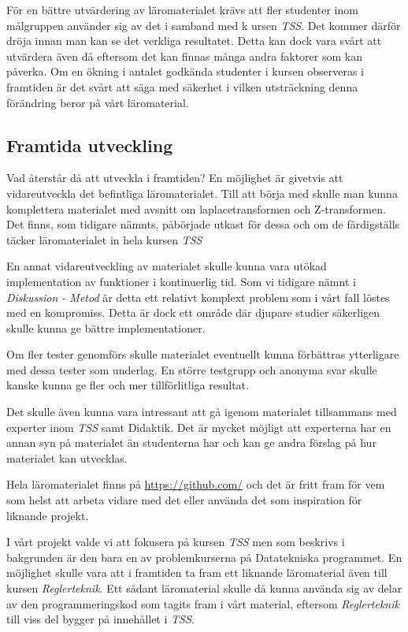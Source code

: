 \documentclass[]{article}
\begin{document}
För en bättre utvärdering av läromaterialet krävs att fler studenter inom målgruppen använder sig av det i samband med k
ursen \textit{TSS}. Det kommer därför dröja innan man kan se det verkliga resultatet. Detta kan dock vara svårt att 
utvärdera även då eftersom det kan finnas många andra faktorer som kan påverka. Om en ökning i antalet godkända 
studenter i kursen observeras i framtiden är det svårt att säga med säkerhet i vilken utsträckning denna förändring 
beror på vårt läromaterial.


\subsection{Framtida utveckling}
Vad återstår då att utveckla i framtiden? En möjlighet är givetvis att vidareutveckla det befintliga 
läromaterialet. Till att börja med skulle man kunna komplettera materialet med avsnitt om laplacetransformen och Z-transformen. Det finns, som tidigare nämnts, påbörjade utkast för dessa och om de färdigställs täcker läromaterialet in hela kursen \textit{TSS}

En annat vidareutveckling av materialet skulle kunna vara utökad implementation av funktioner i kontinuerlig tid. Som vi tidigare nämnt i \textit{Diskussion - Metod} är detta ett relativt komplext problem som i vårt fall löstes med en kompromiss. Detta är dock ett område där djupare studier säkerligen skulle kunna ge bättre implementationer.

Om fler tester genomförs skulle materialet eventuellt kunna förbättras ytterligare med dessa tester som underlag.
En större testgrupp och anonyma svar skulle kanske kunna ge fler och mer tillförlitliga resultat.

Det skulle även kunna vara intressant att gå igenom materialet tillsammans med experter inom \textit{TSS} samt 
Didaktik. Det är mycket möjligt att experterna har en annan syn på materialet än studenterna har och kan ge andra
förslag på hur materialet kan utvecklas.

Hela läromaterialet finns på \url{https://github.com/} och det är fritt fram för vem som helst att arbeta vidare
med det eller använda det som inspiration för liknande projekt.

I vårt projekt valde vi att fokusera på kursen \textit{TSS} men som beskrivs i bakgrunden är den bara en av problemkurserna på Datatekniska programmet. En möjlighet skulle vara att i framtiden ta fram ett liknande läromaterial även till kursen \textit{Reglerteknik}. Ett sådant läromaterial skulle då kunna använda sig av delar av den programmeringskod som tagits fram i vårt material, eftersom \textit{Reglerteknik} till viss del bygger på innehållet i \textit{TSS}.
\end{document}

